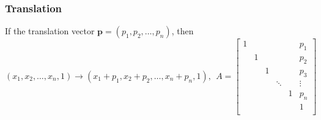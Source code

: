 \documentclass[11pt]{article}
\begin{document}
\subsubsection{Translation}
If the translation vector $\bm{p} = (p_1, p_2, \dots, p_n)$, then
\begin{equation}
    (x_1, x_2, \dots, x_n, 1) \rightarrow (x_1+p_1, x_2+p_2, \dots, x_n+p_n, 1),~~A =
    \begin{bmatrix}
        1 &  &  &  &  & p_1\\
         & 1 &  & &  & p_2\\
         &  & 1 &  &  & p_3\\
         &  &  & \ddots &  &  \vdots\\
         &  &  &  & 1 & p_n\\
         &  &  &  &  & 1\\
    \end{bmatrix}
\end{equation}
\end{document}

